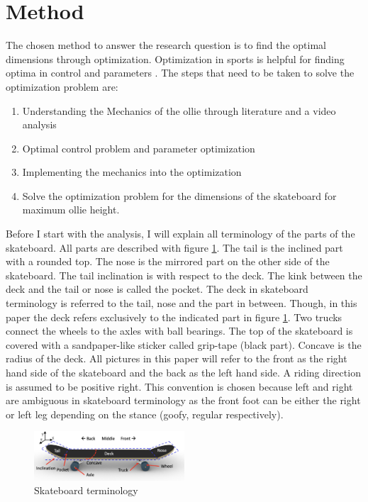 \vspace{-1cm}
\section{Method}
\noindent The chosen method to answer the research question is to find the optimal dimensions through optimization. Optimization in sports is helpful for finding optima in control and parameters \cite{ackermann_optimality_2010}. The steps that need to be taken to solve the optimization problem are:
\begin{enumerate}
    \item Understanding the Mechanics of the ollie through literature and a video analysis
    \item Optimal control problem and parameter optimization
    \item Implementing the mechanics into the optimization
    \item Solve the optimization problem for the dimensions of the skateboard for maximum ollie height. 
\end{enumerate}

Before I start with the analysis, I will explain all terminology of the parts of the skateboard. All parts are described with figure \ref{f_skateterminology}. The tail is the inclined part with a rounded top. The nose is the mirrored part on the other side of the skateboard. The tail inclination is with respect to the deck. The kink between the deck and the tail or nose is called the pocket. The deck in skateboard terminology is referred to the tail, nose and the part in between. Though, in this paper the deck refers exclusively to the indicated part in figure \ref{f_skateterminology}. Two trucks connect the wheels to the axles with ball bearings. The top of the skateboard is covered with a sandpaper-like sticker called grip-tape (black part). Concave is the radius of the deck. All pictures in this paper will refer to the front as the right hand side of the skateboard and the back as the left hand side. A riding direction is assumed to be positive right. This convention is chosen because left and right are ambiguous in skateboard terminology as the front foot can be either the right or left leg depending on the stance (goofy, regular respectively). 
\begin{figure}[b]
\includegraphics[width=0.5\textwidth]{figure/terminology.png}
\caption[Skateboard terminology]{Skateboard terminology}
\label{f_skateterminology}
\end{figure}

